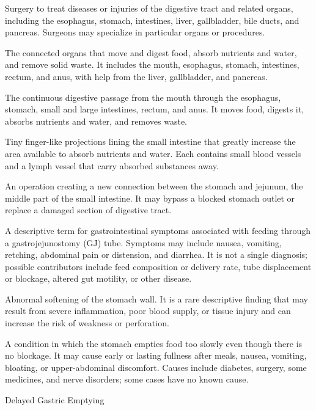  Surgery to treat diseases or injuries of the digestive tract and related organs, including the esophagus, stomach, intestines, liver, gallbladder, bile ducts, and pancreas. Surgeons may specialize in particular organs or procedures.

 The connected organs that move and digest food, absorb nutrients and water, and remove solid waste. It includes the mouth, esophagus, stomach, intestines, rectum, and anus, with help from the liver, gallbladder, and pancreas.

 The continuous digestive passage from the mouth through the esophagus, stomach, small and large intestines, rectum, and anus. It moves food, digests it, absorbs nutrients and water, and removes waste.

 Tiny finger-like projections lining the small intestine that greatly increase the area available to absorb nutrients and water. Each contains small blood vessels and a lymph vessel that carry absorbed substances away.

 An operation creating a new connection between the stomach and jejunum, the middle part of the small intestine. It may bypass a blocked stomach outlet or replace a damaged section of digestive tract.

 A descriptive term for gastrointestinal symptoms associated with feeding through a
gastrojejunostomy (GJ) tube. Symptoms may include nausea, vomiting, retching, abdominal pain
or distension, and diarrhea. It is not a single diagnosis; possible contributors include feed
composition or delivery rate, tube displacement or blockage, altered gut motility, or other disease.

 Abnormal softening of the stomach wall. It is a rare descriptive finding that may result from severe inflammation, poor blood supply, or tissue injury and can increase the risk of weakness or perforation.

 A condition in which the stomach empties food too slowly even though there is no blockage. It may cause early or lasting fullness after meals, nausea, vomiting, bloating, or upper-abdominal discomfort. Causes include diabetes, surgery, some medicines, and nerve disorders; some cases have no known cause.

\synonyms
Delayed Gastric Emptying

